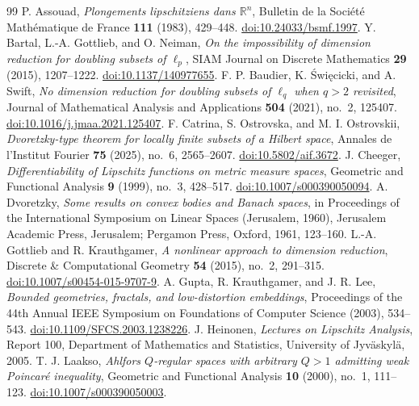 \documentclass[11pt]{article}
\newcommand{\R}{\mathbb R}
\begin{document}
\begin{thebibliography}{99}
P. Assouad, \emph{Plongements lipschitziens dans $\R^n$},
Bulletin de la Soci\'et\'e Math\'ematique de France \textbf{111} (1983), 429--448.
\href{https://doi.org/10.24033/bsmf.1997}{doi:10.24033/bsmf.1997}.
Y. Bartal, L.-A. Gottlieb, and O. Neiman, \emph{On the impossibility of dimension reduction for doubling subsets of $\ell_p$},
SIAM Journal on Discrete Mathematics \textbf{29} (2015), 1207--1222.
\href{https://doi.org/10.1137/140977655}{doi:10.1137/140977655}.
F. P. Baudier, K. \'Swi\k{e}cicki, and A. Swift, \emph{No dimension reduction for doubling subsets of $\ell_q$ when $q>2$ revisited},
Journal of Mathematical Analysis and Applications \textbf{504} (2021), no.~2, 125407.
\href{https://doi.org/10.1016/j.jmaa.2021.125407}{doi:10.1016/j.jmaa.2021.125407}.
F. Catrina, S. Ostrovska, and M. I. Ostrovskii, \emph{Dvoretzky-type theorem for locally finite subsets of a Hilbert space},
Annales de l'Institut Fourier \textbf{75} (2025), no.~6, 2565--2607.
\href{https://doi.org/10.5802/aif.3672}{doi:10.5802/aif.3672}.
J. Cheeger, \emph{Differentiability of Lipschitz functions on metric measure spaces},
Geometric and Functional Analysis \textbf{9} (1999), no.~3, 428--517.
\href{https://doi.org/10.1007/s000390050094}{doi:10.1007/s000390050094}.
A. Dvoretzky, \emph{Some results on convex bodies and Banach spaces},
in Proceedings of the International Symposium on Linear Spaces
(Jerusalem, 1960), Jerusalem Academic Press, Jerusalem;
Pergamon Press, Oxford, 1961, 123--160.
L.-A. Gottlieb and R. Krauthgamer, \emph{A nonlinear approach to dimension reduction},
Discrete \& Computational Geometry \textbf{54} (2015), no.~2, 291--315.
\href{https://doi.org/10.1007/s00454-015-9707-9}{doi:10.1007/s00454-015-9707-9}.
A. Gupta, R. Krauthgamer, and J. R. Lee, \emph{Bounded geometries, fractals, and low-distortion embeddings},
Proceedings of the 44th Annual IEEE Symposium on Foundations of Computer Science (2003), 534--543.
\href{https://doi.org/10.1109/SFCS.2003.1238226}{doi:10.1109/SFCS.2003.1238226}.
J. Heinonen, \emph{Lectures on Lipschitz Analysis},
Report 100, Department of Mathematics and Statistics, University of Jyv\"askyl\"a, 2005.
T. J. Laakso, \emph{Ahlfors $Q$-regular spaces with arbitrary $Q>1$ admitting weak Poincar\'e inequality},
Geometric and Functional Analysis \textbf{10} (2000), no.~1, 111--123.
\href{https://doi.org/10.1007/s000390050003}{doi:10.1007/s000390050003}.

\end{thebibliography}
\end{document}
